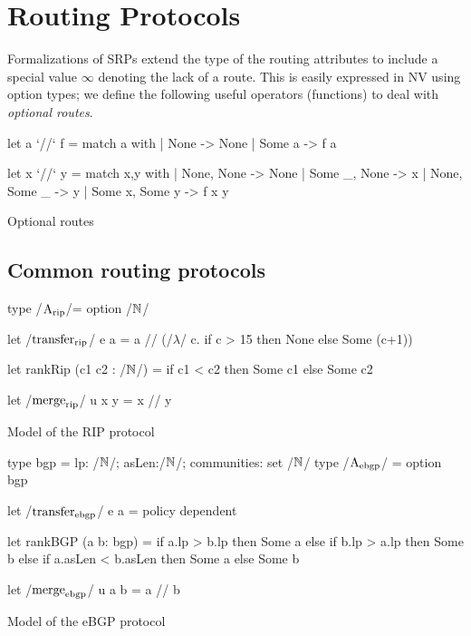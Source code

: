 \documentclass[sigconf,10pt]{acmart}
\begin{document}
\section{Routing Protocols} 

Formalizations of SRPs extend the type of the routing attributes to
include a special value $\infty$ denoting the lack of a route. This is
easily expressed in NV using option types; we define the following
useful operators (functions) to deal with \emph{optional routes}.

\begin{listing}[ht]
\begin{ocamlcode}
  let  a `/\bind/` f =
    match a with
    | None -> None
    | Some a -> f a
    
  let x `//` y =
    match x,y with
    | None, None -> None
    | Some _, None -> x
    | None, Some _ -> y
    | Some x, Some y -> f x y
\end{ocamlcode}
\caption{Optional routes}
\label{lst:options}
\end{listing}

\subsection{Common routing protocols}

\begin{listing}[ht]
\begin{ocamlcode}
  type /$\A_{\rip} $/= option /$\nat$/

  let /$\transfer_{\rip}$/ e a =
    a /\bind/ (/$\lambda$/ c. if c > 15 then None else Some (c+1))

  let rankRip (c1 c2 : /$\nat$/) =
     if c1 < c2 then Some c1 else Some c2
   
  let /$\merge_{\rip}$/ u x y = x // y
\end{ocamlcode}
\caption{Model of the RIP protocol}
\label{lst:rip}
\end{listing}

\begin{listing}[ht]
  \begin{ocamlcode}
  type bgp = {lp: /$\nat$/; asLen:/$\nat$/; communities: set /$\nat$/ }
  type /$\A_{\ebgp}$/ = option bgp

  let /$\transfer_{\ebgp}$/ e a = policy dependent

  let rankBGP (a b: bgp)  =
    if a.lp > b.lp then Some a
    else if b.lp > a.lp then Some b
    else if a.asLen < b.asLen then Some a
    else Some b

  let /$\merge_{\ebgp}$/ u a b = a // b
\end{ocamlcode}
\caption{Model of the eBGP protocol}
\label{lst:ebgp}
\end{listing}
  
\end{document}
